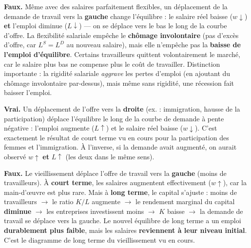 

\begin{reponse}
\textbf{Faux.} Même avec des salaires parfaitement flexibles, un déplacement de la demande de travail vers la \textbf{gauche} change l'équilibre : le salaire réel baisse ($w \downarrow$) \textbf{et} l'emploi diminue ($L \downarrow$) --- on se déplace vers le bas le long de la courbe d'offre. La flexibilité salariale empêche le \textbf{chômage involontaire} (pas d'excès d'offre, car $L^S = L^D$ au nouveau salaire), mais elle n'empêche pas la \textbf{baisse de l'emploi d'équilibre}. Certains travailleurs quittent volontairement le marché, car le salaire plus bas ne compense plus le coût de travailler. Distinction importante : la rigidité salariale \textit{aggrave} les pertes d'emploi (en ajoutant du chômage involontaire par-dessus), mais même sans rigidité, une récession fait baisser l'emploi.
\end{reponse}


\begin{reponse}
\textbf{Vrai.} Un déplacement de l'offre vers la \textbf{droite} (ex. : immigration, hausse de la participation) déplace l'équilibre le long de la courbe de demande à pente négative : l'emploi augmente ($L \uparrow$) et le salaire réel baisse ($w \downarrow$). C'est exactement le résultat de court terme vu en cours pour la participation des femmes et l'immigration. À l'inverse, si la demande avait augmenté, on aurait observé $w \uparrow$ \textbf{et} $L \uparrow$ (les deux dans le même sens).
\end{reponse}


\begin{reponse}
\textbf{Faux.} Le vieillissement déplace l'offre de travail vers la \textbf{gauche} (moins de travailleurs). À \textbf{court terme}, les salaires augmentent effectivement ($w \uparrow$), car la main-d'{\oe}uvre est plus rare. Mais à \textbf{long terme}, le capital s'ajuste : moins de travailleurs $\to$ le ratio $K/L$ augmente $\to$ le rendement marginal du capital \textbf{diminue} $\to$ les entreprises investissent moins $\to$ $K$ baisse $\to$ la demande de travail se déplace vers la gauche. Le nouvel équilibre de long terme a un emploi \textbf{durablement plus faible}, mais les salaires \textbf{reviennent à leur niveau initial}. C'est le diagramme de long terme du vieillissement vu en cours.
\end{reponse}


